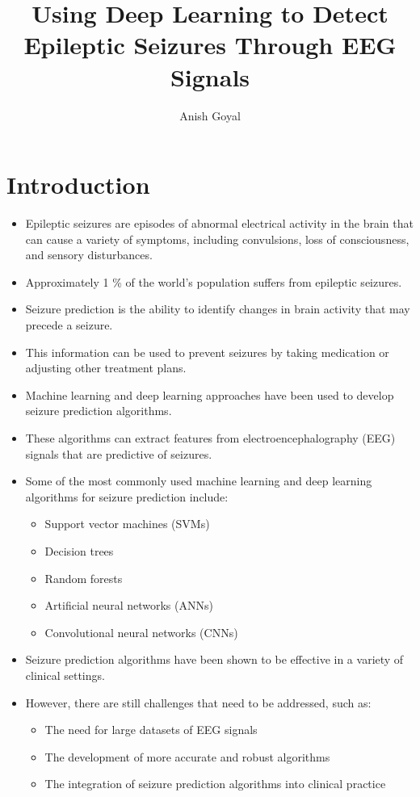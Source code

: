 \documentclass[stu,donotrepeattitle]{apa7}
\title{Using Deep Learning to Detect Epileptic Seizures Through EEG Signals}
\author{Anish Goyal}
\begin{document}
\maketitle
\newpage

\section{Introduction}
\begin{itemize}
    \item Epileptic seizures are episodes of abnormal electrical activity in the brain that can cause a variety of symptoms, including convulsions, loss of consciousness, and sensory disturbances.
    \item Approximately 1 \% of the world's population suffers from epileptic seizures.   
    \item Seizure prediction is the ability to identify changes in brain activity that may precede a seizure.
    \item This information can be used to prevent seizures by taking medication or adjusting other treatment plans.
    \item Machine learning and deep learning approaches have been used to develop seizure prediction algorithms.
    \item These algorithms can extract features from electroencephalography (EEG) signals that are predictive of seizures.
    \item Some of the most commonly used machine learning and deep learning algorithms for seizure prediction include:
    \begin{itemize}
    \item Support vector machines (SVMs)
    \item Decision trees
    \item Random forests
    \item Artificial neural networks (ANNs)
    \item Convolutional neural networks (CNNs)
    \end{itemize}
    \item Seizure prediction algorithms have been shown to be effective in a variety of clinical settings.
    \item However, there are still challenges that need to be addressed, such as:
    \begin{itemize}
    \item The need for large datasets of EEG signals
    \item The development of more accurate and robust algorithms
    \item The integration of seizure prediction algorithms into clinical practice
    \end{itemize}
\end{itemize}
\end{document}
